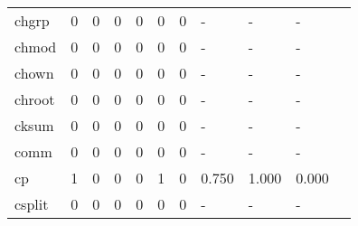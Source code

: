 \begin{longtable}{lp{1.10cm}p{1.10cm}p{1.10cm}p{1.10cm}p{1.10cm}p{1.10cm}p{1.10cm}p{1.10cm}p{1.10cm}p{1.10cm}}
chgrp     &                      0 &                                  0 &                                 0 &                                0 &                                 0 &                               0 &                              - &                                     - &                                   - \\
chmod     &                      0 &                                  0 &                                 0 &                                0 &                                 0 &                               0 &                              - &                                     - &                                   - \\
chown     &                      0 &                                  0 &                                 0 &                                0 &                                 0 &                               0 &                              - &                                     - &                                   - \\
chroot    &                      0 &                                  0 &                                 0 &                                0 &                                 0 &                               0 &                              - &                                     - &                                   - \\
cksum     &                      0 &                                  0 &                                 0 &                                0 &                                 0 &                               0 &                              - &                                     - &                                   - \\
comm      &                      0 &                                  0 &                                 0 &                                0 &                                 0 &                               0 &                              - &                                     - &                                   - \\
cp        &                      1 &                                  0 &                                 0 &                                0 &                                 1 &                               0 &                          0.750 &                                 1.000 &                               0.000 \\
csplit    &                      0 &                                  0 &                                 0 &                                0 &                                 0 &                               0 &                              - &                                     - &                                   - \\

\end{longtable}
